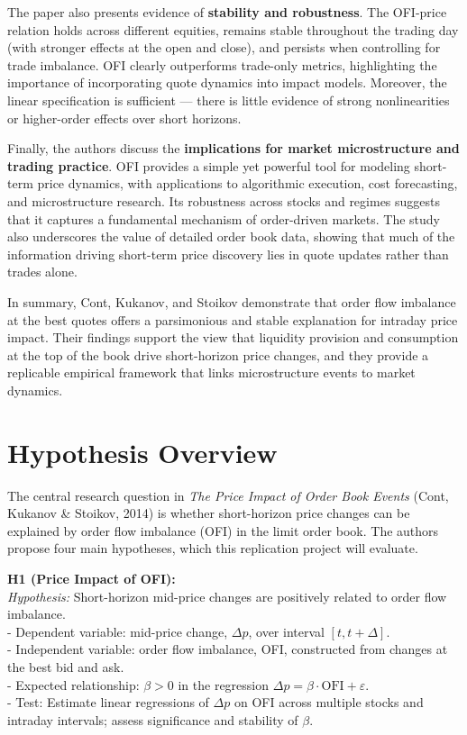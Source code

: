 \documentclass{article}
\begin{document}
The paper also presents evidence of \textbf{stability and robustness}.
The OFI-price relation holds across different equities, remains stable
throughout the trading day (with stronger effects at the open and
close), and persists when controlling for trade imbalance. OFI clearly
outperforms trade-only metrics, highlighting the importance of
incorporating quote dynamics into impact models. Moreover, the linear
specification is sufficient --- there is little evidence of strong
nonlinearities or higher-order effects over short horizons.

Finally, the authors discuss the \textbf{implications for market
microstructure and trading practice}. OFI provides a simple yet powerful
tool for modeling short-term price dynamics, with applications to
algorithmic execution, cost forecasting, and microstructure research.
Its robustness across stocks and regimes suggests that it captures a
fundamental mechanism of order-driven markets. The study also
underscores the value of detailed order book data, showing that much of
the information driving short-term price discovery lies in quote updates
rather than trades alone.

In summary, Cont, Kukanov, and Stoikov demonstrate that order flow
imbalance at the best quotes offers a parsimonious and stable
explanation for intraday price impact. Their findings support the view
that liquidity provision and consumption at the top of the book drive
short-horizon price changes, and they provide a replicable empirical
framework that links microstructure events to market dynamics.

\section{Hypothesis Overview}\label{hypothesis-overview}

The central research question in \emph{The Price Impact of Order Book
Events} (Cont, Kukanov \& Stoikov, 2014) is whether short-horizon price
changes can be explained by order flow imbalance (OFI) in the limit
order book. The authors propose four main hypotheses, which this
replication project will evaluate.

\textbf{H1 (Price Impact of OFI):}\\
\emph{Hypothesis:} Short-horizon mid-price changes are positively
related to order flow imbalance.\\
- Dependent variable: mid-price change, \(\Delta p\), over interval
\([t, t+\Delta]\).\\
- Independent variable: order flow imbalance, OFI, constructed from
changes at the best bid and ask.\\
- Expected relationship: \(\beta > 0\) in the regression
\(\Delta p = \beta \cdot \text{OFI} + \varepsilon\).\\
- Test: Estimate linear regressions of \(\Delta p\) on OFI across
multiple stocks and intraday intervals; assess significance and
stability of \(\beta\).
\end{document}
